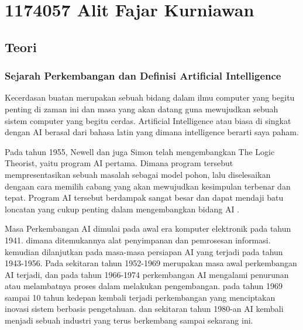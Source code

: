 \section{1174057 Alit Fajar Kurniawan}
\subsection{Teori}
	\subsubsection {Sejarah Perkembangan dan Definisi Artiﬁcial Intelligence}
	Kecerdasan buatan merupakan sebuah bidang dalam ilmu computer yang begitu penting di zaman ini dan masa yang akan datang guna mewujudkan sebuah sistem computer yang begitu cerdas. Artiﬁcial Intelligence atau biasa di singkat dengan AI berasal dari bahasa latin yang dimana intelligence berarti saya paham. 
	\par Pada tahun 1955, Newell dan juga Simon telah mengembangkan The Logic Theorist, yaitu program AI pertama. Dimana program tersebut mempresentasikan sebuah masalah sebagai model pohon, lalu diselesaikan dengaan cara memilih cabang yang akan mewujudkan kesimpulan terbenar dan tepat. Program AI tersebut berdampak sangat besar dan dapat mendaji batu loncatan yang cukup penting dalam mengembangkan bidang AI \cite{baraja2008kecerdasan}.
	\par
	Masa Perkembangan AI dimulai pada awal era komputer elektronik pada tahun 1941. dimana ditemukannya alat penyimpanan dan pemrosesan informasi. kemudian dilanjutkan pada masa-masa persiapan AI yang terjadi pada tahun 1943-1956. Pada sekitaran tahun 1952-1969 merupakan masa awal perkembangan AI terjadi, dan pada tahun 1966-1974 perkembangan AI mengalami penurunan atau melambatnya proses dalam melakukan pengembangan. pada tahun 1969 sampai 10 tahun kedepan kembali terjadi perkembangan yang menciptakan inovasi sistem berbasis pengetahuan. dan sekitaran tahun 1980-an AI kembali menjadi sebuah industri yang terus berkembang sampai sekarang ini.


